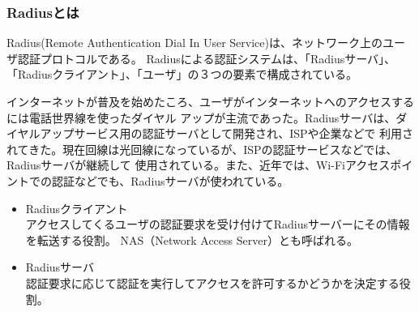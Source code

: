 \documentclass[11pt,a4j,titlepage]{jreport}
\begin{document}
\subsubsection*{Radiusとは}
Radius(Remote Authentication Dial In User Service)は、ネットワーク上のユーザ認証プロトコルである。
Radiusによる認証システムは、「Radiusサーバ」、「Radiusクライアント」、「ユーザ」の３つの要素で構成されている。

インターネットが普及を始めたころ、ユーザがインターネットへのアクセスするには電話世界線を使ったダイヤル
アップが主流であった。Radiusサーバは、ダイヤルアップサービス用の認証サーバとして開発され、ISPや企業などで
利用されてきた。現在回線は光回線になっているが、ISPの認証サービスなどでは、Radiusサーバが継続して
使用されている。また、近年では、Wi-Fiアクセスポイントでの認証などでも、Radiusサーバが使われている。

\begin{itemize}
    \setlength{\parskip}{0.05cm} %
    \setlength{\itemsep}{0.05cm} 
    \item Radiusクライアント\mbox{}\\
    アクセスしてくるユーザの認証要求を受け付けてRadiusサーバーにその情報を転送する役割。
    NAS（Network Access Server）とも呼ばれる。
    \item Radiusサーバ\mbox{}\\
    認証要求に応じて認証を実行してアクセスを許可するかどうかを決定する役割。
\end{itemize}
\end{document}
